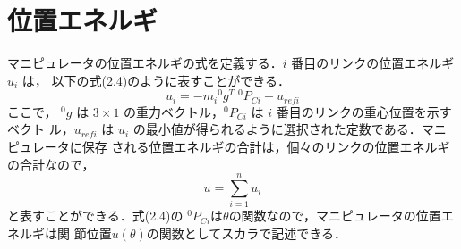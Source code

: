 
 \section{位置エネルギ}


マニピュレータの位置エネルギの式を定義する．$i$ 番目のリンクの位置エネルギ $u_i$ は，
以下の式(2.4)のように表すことができる．
\begin{equation}
     u_i =-m_i {}^{0}g^T \; {}^{0}P_{Ci} + u_{refi}
\end{equation}
ここで， ${}^{0}g$ は $3 × 1$ の重力ベクトル，${}^{0}P_{Ci}$ は $i$ 番目のリンクの重心位置を示すベクト
ル，$u_{refi}$ は $u_i$ の最小値が得られるように選択された定数である．マニピュレータに保存
される位置エネルギの合計は，個々のリンクの位置エネルギの合計なので，
\begin{equation}
     u= \sum^{n}_{i=1}u_{i}
\end{equation}
と表すことができる．式(2.4)の ${}^{0}P_{Ci}$は$\theta$の関数なので，マニピュレータの位置エネルギは関
節位置$u(\theta)$の関数としてスカラで記述できる．
\newpage
